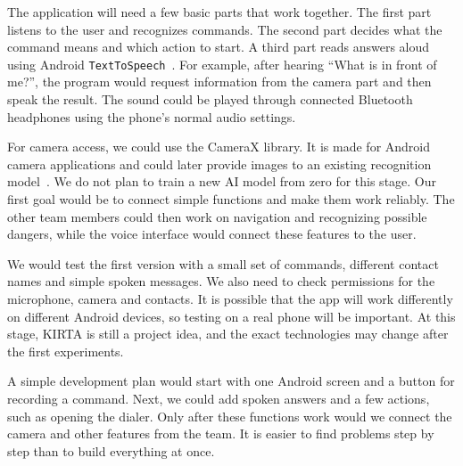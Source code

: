 \documentclass[10pt,twoside,english,a4paper]{article}
\begin{document}
The application will need a few basic parts that work together. The first part listens to the user and recognizes commands. The second part decides what the command means and which action to start. A third part reads answers aloud using Android \texttt{TextToSpeech}~\cite{androidtts}. For example, after hearing ``What is in front of me?'', the program would request information from the camera part and then speak the result. The sound could be played through connected Bluetooth headphones using the phone's normal audio settings.

For camera access, we could use the CameraX library. It is made for Android camera applications and could later provide images to an existing recognition model~\cite{androidcamerax}. We do not plan to train a new AI model from zero for this stage. Our first goal would be to connect simple functions and make them work reliably. The other team members could then work on navigation and recognizing possible dangers, while the voice interface would connect these features to the user.

We would test the first version with a small set of commands, different contact names and simple spoken messages. We also need to check permissions for the microphone, camera and contacts. It is possible that the app will work differently on different Android devices, so testing on a real phone will be important. At this stage, KIRTA is still a project idea, and the exact technologies may change after the first experiments.

A simple development plan would start with one Android screen and a button for recording a command. Next, we could add spoken answers and a few actions, such as opening the dialer. Only after these functions work would we connect the camera and other features from the team. It is easier to find problems step by step than to build everything at once.



{\small

}

\end{document}
